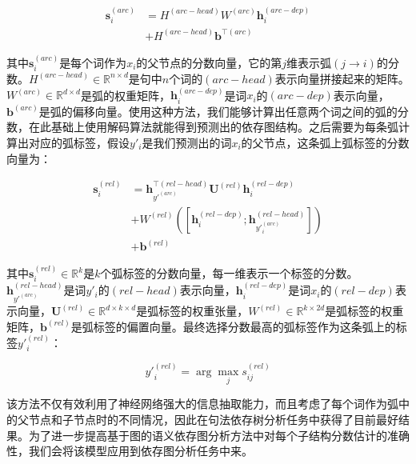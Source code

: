 \begin{equation}
\begin{split}
\mathbf{s}^{(arc)}_i & = H^{(arc-head)}W^{(arc)}\mathbf{h}^{(arc-dep)}_i \\
& + H^{(arc-head)}\mathbf{b}^{\top(arc)}
\end{split}
\end{equation}

其中$\mathbf{s}^{(arc)}_i$是每个词作为$x_i$的父节点的分数向量，它的第$j$维表示弧$(j\rightarrow i)$的分数。$H^{(arc-head)} \in \mathbb{R}^{n \times d}$是句中$n$个词的$(arc-head)$表示向量拼接起来的矩阵。$W^{(arc)} \in \mathbb{R}^{d \times d}$是弧的权重矩阵，$\mathbf{h}^{(arc-dep)}_i$是词$x_i$的$(arc-dep)$表示向量，$\mathbf{b}^{(arc)}$是弧的偏移向量。使用这种方法，我们能够计算出任意两个词之间的弧的分数，在此基础上使用解码算法就能得到预测出的依存图结构。之后需要为每条弧计算出对应的弧标签，假设$y'_i$是我们预测出的词$x_i$的父节点，这条弧上弧标签的分数向量为：

\begin{equation}
\begin{split}
\mathbf{s}^{(rel)}_i & = \mathbf{h}_{y'^{(arc)}}^{\top(rel-head)}\mathbf{U}^{(rel)}\mathbf{h}^{(rel-dep)}_i \\
& + W^{(rel)}([\mathbf{h}^{(rel-dep)}_i; \mathbf{h}^{(rel-head)}_{y'^{(arc)}_i}]) \\
& + \mathbf{b}^{(rel)}
\end{split}
\end{equation}

其中$\mathbf{s}^{(rel)}_i \in \mathbb{R}^{k}$是$k$个弧标签的分数向量，每一维表示一个标签的分数。$\mathbf{h}_{y'^{(arc)}}^{(rel-head)}$是词$y'_i$的$(rel-head)$表示向量，$\mathbf{h}^{(rel-dep)}_i$是词$x_i$的$(rel-dep)$表示向量，$\mathbf{U}^{(rel)} \in \mathbb{R}^{d\times k \times d}$是弧标签的权重张量，$W^{(rel)} \in \mathbb{R}^{k \times 2d}$是弧标签的权重矩阵，$\mathbf{b}^{(rel)}$是弧标签的偏置向量。最终选择分数最高的弧标签作为这条弧上的标签$y'^{(rel)}_i$：

\begin{equation}
y'^{(rel)}_i = \arg \max_j s^{(rel)}_{ij}
\end{equation}

该方法不仅有效利用了神经网络强大的信息抽取能力，而且考虑了每个词作为弧中的父节点和子节点时的不同情况，因此在句法依存树分析任务中获得了目前最好结果。为了进一步提高基于图的语义依存图分析方法中对每个子结构分数估计的准确性，我们会将该模型应用到依存图分析任务中来。


